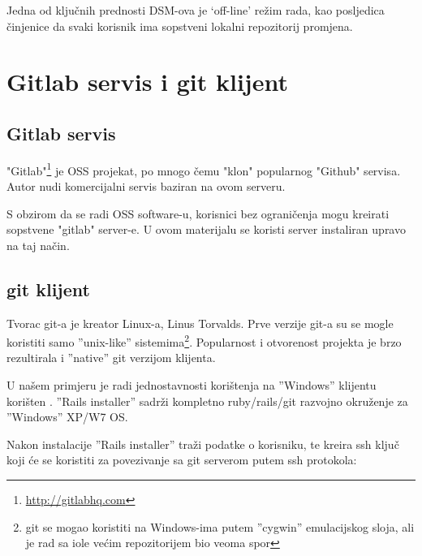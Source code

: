 \documentclass[times, utf8, seminar]{fit}
\begin{document}
Jedna od ključnih prednosti DSM-ova je `off-line' režim rada, kao posljedica činjenice da svaki korisnik ima sopstveni lokalni repozitorij promjena.

\chapter{Gitlab servis i git klijent}
\vspace*{-0.7cm}

\section{Gitlab servis}

"Gitlab"\footnote{\url{http://gitlabhq.com}} je OSS projekat, po mnogo čemu "klon" popularnog "Github" servisa. 
Autor nudi komercijalni servis \href{https://gitlab.com}{\color{blue}{''gitlab.com''}} baziran na ovom serveru.

S obzirom da se radi OSS software-u, korisnici bez ograničenja mogu kreirati sopstvene "gitlab" server-e.
U ovom materijalu se koristi server \href{https://gitlab.knowhow.out.ba}{\color{blue}{''gitlab.knowhow.out.ba''}} instaliran upravo na taj način.

\section{git klijent}

Tvorac git-a je kreator Linux-a, Linus Torvalds.
Prve verzije git-a su se mogle koristiti samo ''unix-like'' sistemima\footnote{git se mogao koristiti na Windows-ima putem ''cygwin'' emulacijskog sloja, ali je rad sa iole većim repozitorijem bio veoma spor}. 
Popularnost i otvorenost projekta je brzo rezultirala i ''native'' git verzijom klijenta.

U našem primjeru je radi jednostavnosti korištenja na ''Windows'' klijentu korišten \href{http://railsinstaller.org/}{\color{blue}{''Rails installer''}}. 
''Rails installer'' sadrži kompletno ruby/rails/git razvojno okruženje za ''Windows'' XP/W7 OS.

Nakon instalacije ''Rails installer'' traži podatke o korisniku, te kreira ssh ključ koji će se koristiti za povezivanje sa git serverom putem ssh protokola:
\end{document}
